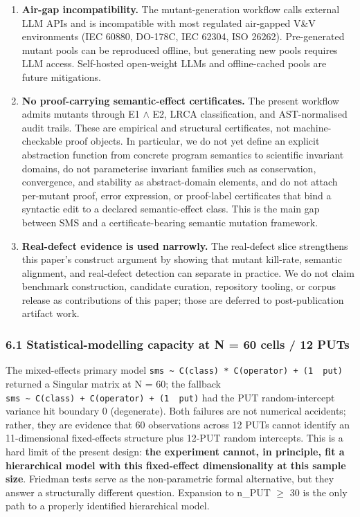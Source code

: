 \documentclass[review,12pt,authoryear]{elsarticle}
\begin{document}
\begin{enumerate}
  semantic complexity. Future work will validate SMS portability on
  industrial-grade multi-output PUTs.
\item
  \textbf{Air-gap incompatibility.} The mutant-generation workflow calls
  external LLM APIs and is incompatible with most regulated air-gapped
  V\&V environments (IEC 60880, DO-178C, IEC 62304, ISO 26262).
  Pre-generated mutant pools can be reproduced offline, but generating
  new pools requires LLM access. Self-hosted open-weight LLMs and
  offline-cached pools are future mitigations.
\item
  \textbf{No proof-carrying semantic-effect certificates.} The present
  workflow admits mutants through E1 $\wedge$ E2, LRCA classification, and
  AST-normalised audit trails. These are empirical and structural
  certificates, not machine-checkable proof objects. In particular, we
  do not yet define an explicit abstraction function from concrete
  program semantics to scientific invariant domains, do not parameterise
  invariant families such as conservation, convergence, and stability as
  abstract-domain elements, and do not attach per-mutant proof, error
  expression, or proof-label certificates that bind a syntactic edit to
  a declared semantic-effect class. This is the main gap between SMS and
  a certificate-bearing semantic mutation framework.
\item
  \textbf{Real-defect evidence is used narrowly.} The real-defect slice
  strengthens this paper's construct argument by showing that mutant
  kill-rate, semantic alignment, and real-defect detection can separate
  in practice. We do not claim benchmark construction, candidate curation,
  repository tooling, or corpus release as contributions of this paper;
  those are deferred to post-publication artifact work.
\end{enumerate}

\subsubsection{6.1 Statistical-modelling capacity at N = 60 cells / 12 PUTs}\label{statistical-modelling-capacity-at-n-60-cells-12-puts}

The mixed-effects primary model
\texttt{sms\ \textasciitilde{}\ C(class)\ *\ C(operator)\ +\ (1\ \textbar{}\ put)}
returned a Singular matrix at N = 60; the fallback
\texttt{sms\ \textasciitilde{}\ C(class)\ +\ C(operator)\ +\ (1\ \textbar{}\ put)}
had the PUT random-intercept variance hit boundary 0 (degenerate). Both
failures are not numerical accidents; rather, they are evidence that 60
observations across 12 PUTs cannot identify an 11-dimensional
fixed-effects structure plus 12-PUT random intercepts. This is a hard
limit of the present design: \textbf{the experiment cannot, in
principle, fit a hierarchical model with this fixed-effect
dimensionality at this sample size}. Friedman tests serve as the
non-parametric formal alternative, but they answer a structurally
different question. Expansion to n\_PUT $\geq$ 30 is the only path to a
properly identified hierarchical model.
\end{document}
